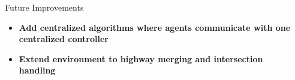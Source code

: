 \documentclass[final]{beamer}
\newlength{\sepmargin}
\newlength{\onecolwid}
\begin{document}
\begin{frame}[t]
\begin{columns}[t]
\begin{column}{\onecolwid}
\begin{block}{Future Improvements}
    \begin{itemize}
      \item \textbf{Add centralized algorithms where agents communicate with one centralized controller}
      \item \textbf{Extend environment to highway merging and intersection handling}
    \end{itemize}
\end{block} 

\end{column}
\begin{column}{\sepmargin} \end{column}
\end{columns} 
\end{frame} 
	
\end{document}
